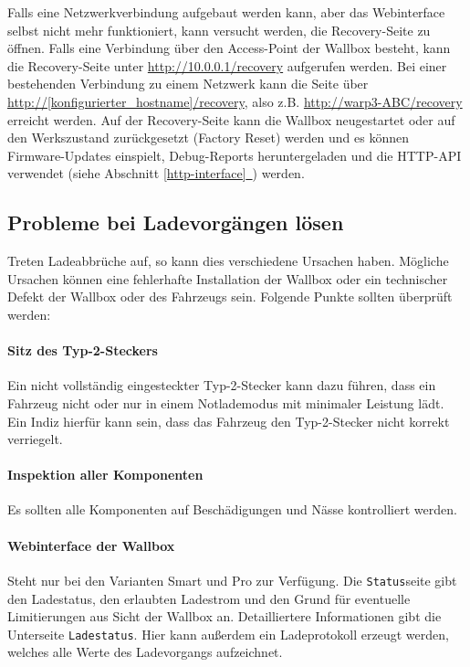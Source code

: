 \documentclass[a4paper,10pt]{article}
\newcommand*{\fullref}[1]{Abschnitt \hyperref[{#1}]{\ref*{#1}~\nameref*{#1}}}
\begin{document}
\begin{multicols*}{2}
    Falls eine Netzwerkverbindung aufgebaut werden kann, aber das Webinterface
	selbst nicht mehr funktioniert, kann versucht werden, die Recovery-Seite zu öffnen.
    Falls eine Verbindung über den Access-Point der Wallbox besteht, kann
	die Recovery-Seite unter \url{http://10.0.0.1/recovery} aufgerufen werden. Bei einer bestehenden Verbindung zu einem Netzwerk kann die Seite über \url{http://[konfigurierter_hostname]/recovery}, also z.B. \url{http://warp3-ABC/recovery} erreicht werden.
    Auf der Recovery-Seite kann die Wallbox neugestartet oder auf den Werkszustand zurückgesetzt (Factory Reset) werden und es können Firmware-Updates einspielt, Debug-Reports
    heruntergeladen und die HTTP-API verwendet (siehe \fullref{http-interface}) werden.

    \subsection{Probleme bei Ladevorgängen lösen}
    Treten Ladeabbrüche auf, so kann dies verschiedene Ursachen haben. Mögliche
    Ursachen können eine fehlerhafte Installation der Wallbox oder ein
    technischer Defekt der Wallbox oder des Fahrzeugs sein.
    Folgende Punkte sollten überprüft werden:

    \paragraph*{Sitz des Typ-2-Steckers} Ein nicht vollständig eingesteckter Typ-2-Stecker kann dazu führen,
        dass ein Fahrzeug nicht oder nur in einem Notlademodus mit minimaler Leistung lädt. Ein Indiz hierfür kann sein, dass
        das Fahrzeug den Typ-2-Stecker nicht korrekt verriegelt.
    \paragraph{Inspektion aller Komponenten} Es sollten alle Komponenten
        auf Beschädigungen und Nässe kontrolliert werden.
    \paragraph{Webinterface der Wallbox} Steht nur bei den Varianten Smart und
        Pro zur Verfügung. Die \texttt{Status}seite gibt den Ladestatus, den erlaubten Ladestrom und den Grund für eventuelle Limitierungen aus
        Sicht der Wallbox an. Detailliertere Informationen gibt die
        Unterseite \texttt{Ladestatus}. Hier kann außerdem ein Ladeprotokoll
        erzeugt werden, welches alle Werte des Ladevorgangs aufzeichnet.

\end{multicols*}
\end{document}
